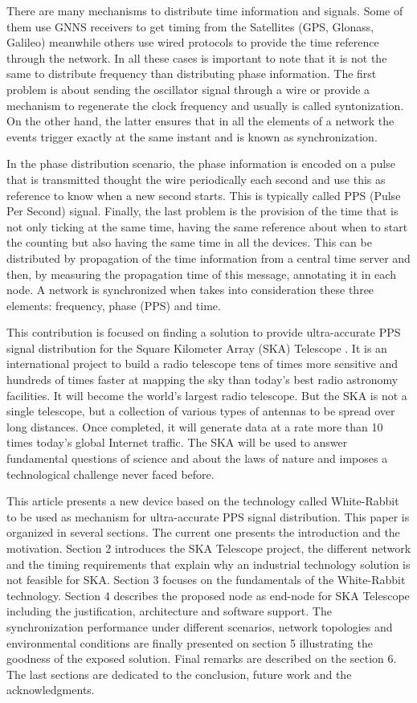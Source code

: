 There are many mechanisms to distribute time information and signals. Some of them use GNNS receivers to get timing from the Satellites (GPS, Glonass, Galileo) meanwhile others use wired protocols to provide the time reference through the network. In all these cases is important to note that it is not the same to distribute frequency than distributing phase information. The first problem is about sending the oscillator signal through a wire or provide a mechanism to regenerate the clock frequency and usually is called syntonization. On the other hand, the latter ensures that in all the elements of a network the events trigger exactly at the same instant and is known as synchronization. 

In the phase distribution scenario, the phase information is encoded on a pulse that is transmitted thought the wire periodically each second and use this as reference to know when a new second starts. This is typically called PPS (Pulse Per Second) signal. Finally, the last problem is the provision of the time that is not only ticking at the same time, having the same reference about when to start the counting but also having the same time in all the devices. This can be distributed by propagation of the time information from a central time server and then, by measuring the propagation time of this message, annotating it in each node. A network is synchronized when takes into consideration these three elements: frequency, phase (PPS) and time.

This contribution is focused on finding a solution to provide ultra-accurate PPS signal distribution for the Square Kilometer Array (SKA) Telescope \cite{ska:project_website}. It is an international project to build a radio telescope tens of times more sensitive and hundreds of times faster at mapping the sky than today’s best radio astronomy facilities. It will become the world’s largest radio telescope. But the SKA is not a single telescope, but a collection of various types of antennas to be spread over long distances. Once completed, it will generate data at a rate more than 10 times today’s global Internet traffic. The SKA will be used to answer fundamental questions of science and about the laws of nature and imposes a technological challenge never faced before. 

This article presents a new device based on the technology called White-Rabbit \cite{ohwr:wr_wiki} to be used as mechanism for ultra-accurate PPS signal distribution. This paper is organized in several sections. The current one presents the introduction and the motivation. Section 2 introduces the SKA Telescope project, the different network and the timing requirements that explain why an industrial technology solution is not feasible for SKA. Section 3 focuses on the fundamentals of the White-Rabbit technology. Section 4 describes the proposed node as end-node for SKA Telescope including the justification, architecture and software support. The synchronization performance under different scenarios, network topologies and environmental conditions are finally presented on section 5 illustrating the goodness of the exposed solution. Final remarks are described on the section 6. The last sections are dedicated to the conclusion, future work and the acknowledgments.